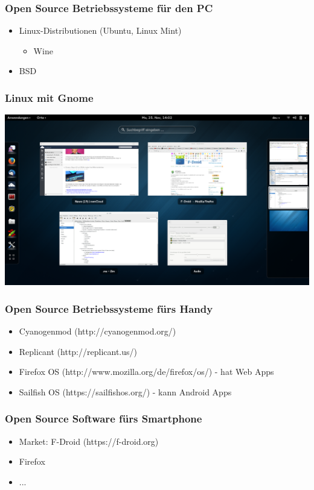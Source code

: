 \documentclass[12pt]{beamer}
\begin{document}
\begin{frame}
    \frametitle{Open Source Betriebssysteme für den PC}
    \begin{itemize}
      \item Linux-Distributionen (Ubuntu, Linux Mint)
        \begin{itemize}
          \item Wine
      \end{itemize}
      \item BSD
    \end{itemize}
\end{frame}

\begin{frame}
    \frametitle{Linux mit Gnome}
    \begin{center}
      \includegraphics[height=0.7\textheight]{img/gnome.png}
    \end{center}
\end{frame}

\begin{frame}
    \frametitle{Open Source Betriebssysteme fürs Handy}
    \begin{itemize}
      \item Cyanogenmod (http://cyanogenmod.org/)
      \item Replicant (http://replicant.us/)
      \item Firefox OS (http://www.mozilla.org/de/firefox/os/) - hat Web Apps
      \item Sailfish OS (https://sailfishos.org/) - kann Android Apps
    \end{itemize}
\end{frame}

\begin{frame}
    \frametitle{Open Source Software fürs Smartphone}
    \begin{itemize}
      \item Market: F-Droid (https://f-droid.org)
      \item Firefox
      \item ...
    \end{itemize}
\end{frame}
\end{document}
